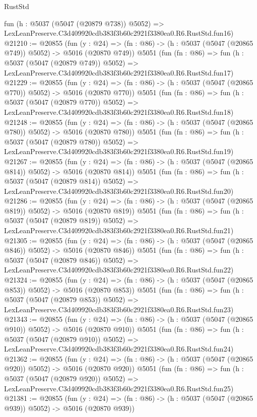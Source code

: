 \begin{lexlean}{RustStd}
\begin{coremodule}
    fun (h : @5037 (@5047 (@20879 @738)) @5052) =>
    LexLeanPreserve.C3d409920cdb383f3b60c2921f3380ea0.R6.RustStd.fun16)
@21210 := @20855
    (fun (y : @24) => (fn : @86) -> (h : @5037 (@5047 (@20865 @749)) @5052) -> @5016 (@20870 @749))
    @5051
    (fun (fn : @86) =>
    fun (h : @5037 (@5047 (@20879 @749)) @5052) =>
    LexLeanPreserve.C3d409920cdb383f3b60c2921f3380ea0.R6.RustStd.fun17)
@21229 := @20855
    (fun (y : @24) => (fn : @86) -> (h : @5037 (@5047 (@20865 @770)) @5052) -> @5016 (@20870 @770))
    @5051
    (fun (fn : @86) =>
    fun (h : @5037 (@5047 (@20879 @770)) @5052) =>
    LexLeanPreserve.C3d409920cdb383f3b60c2921f3380ea0.R6.RustStd.fun18)
@21248 := @20855
    (fun (y : @24) => (fn : @86) -> (h : @5037 (@5047 (@20865 @780)) @5052) -> @5016 (@20870 @780))
    @5051
    (fun (fn : @86) =>
    fun (h : @5037 (@5047 (@20879 @780)) @5052) =>
    LexLeanPreserve.C3d409920cdb383f3b60c2921f3380ea0.R6.RustStd.fun19)
@21267 := @20855
    (fun (y : @24) => (fn : @86) -> (h : @5037 (@5047 (@20865 @814)) @5052) -> @5016 (@20870 @814))
    @5051
    (fun (fn : @86) =>
    fun (h : @5037 (@5047 (@20879 @814)) @5052) =>
    LexLeanPreserve.C3d409920cdb383f3b60c2921f3380ea0.R6.RustStd.fun20)
@21286 := @20855
    (fun (y : @24) => (fn : @86) -> (h : @5037 (@5047 (@20865 @819)) @5052) -> @5016 (@20870 @819))
    @5051
    (fun (fn : @86) =>
    fun (h : @5037 (@5047 (@20879 @819)) @5052) =>
    LexLeanPreserve.C3d409920cdb383f3b60c2921f3380ea0.R6.RustStd.fun21)
@21305 := @20855
    (fun (y : @24) => (fn : @86) -> (h : @5037 (@5047 (@20865 @846)) @5052) -> @5016 (@20870 @846))
    @5051
    (fun (fn : @86) =>
    fun (h : @5037 (@5047 (@20879 @846)) @5052) =>
    LexLeanPreserve.C3d409920cdb383f3b60c2921f3380ea0.R6.RustStd.fun22)
@21324 := @20855
    (fun (y : @24) => (fn : @86) -> (h : @5037 (@5047 (@20865 @853)) @5052) -> @5016 (@20870 @853))
    @5051
    (fun (fn : @86) =>
    fun (h : @5037 (@5047 (@20879 @853)) @5052) =>
    LexLeanPreserve.C3d409920cdb383f3b60c2921f3380ea0.R6.RustStd.fun23)
@21343 := @20855
    (fun (y : @24) => (fn : @86) -> (h : @5037 (@5047 (@20865 @910)) @5052) -> @5016 (@20870 @910))
    @5051
    (fun (fn : @86) =>
    fun (h : @5037 (@5047 (@20879 @910)) @5052) =>
    LexLeanPreserve.C3d409920cdb383f3b60c2921f3380ea0.R6.RustStd.fun24)
@21362 := @20855
    (fun (y : @24) => (fn : @86) -> (h : @5037 (@5047 (@20865 @920)) @5052) -> @5016 (@20870 @920))
    @5051
    (fun (fn : @86) =>
    fun (h : @5037 (@5047 (@20879 @920)) @5052) =>
    LexLeanPreserve.C3d409920cdb383f3b60c2921f3380ea0.R6.RustStd.fun25)
@21381 := @20855
    (fun (y : @24) => (fn : @86) -> (h : @5037 (@5047 (@20865 @939)) @5052) -> @5016 (@20870 @939))

\end{coremodule}
\end{lexlean}
